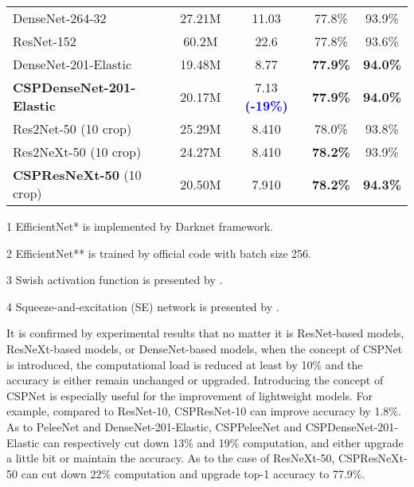 \documentclass{article}
\begin{document}
\begin{table}[h]
\begin{threeparttable}[h]
\begin{tabular}{lcccc}
			DenseNet-264-32 \cite{huang2017densely} & 27.21M & 11.03 & 77.8\% & 93.9\% \\
			ResNet-152 \cite{he2016deep} & 60.2M & 22.6 & 77.8\% & 93.6\% \\
			\midrule
			DenseNet-201-Elastic \cite{wang2019elastic} & 19.48M & 8.77 &  \textbf{77.9\%} &  \textbf{94.0\%} \\
			\textbf{CSPDenseNet-201-Elastic} & 20.17M & 7.13 \textbf{\textcolor{blue}{(-19\%)}} & \textbf{77.9\%} & \textbf{94.0\%} \\
			\midrule
			Res2Net-50 (10 crop) \cite{gao2019res2net} & 25.29M & 8.410 & 78.0\% & 93.8\% \\
			Res2NeXt-50 (10 crop) \cite{gao2019res2net} & 24.27M & 8.410 & \textbf{78.2\%} & 93.9\% \\
			\textbf{CSPResNeXt-50} (10 crop) & 20.50M & 7.910 & \textbf{78.2\%} & \textbf{94.3\%} \\
			\bottomrule
		\end{tabular}
		\begin{tablenotes}[flushleft]
			\footnotesize
			\item[1] EfficientNet* is implemented by Darknet framework.
			\item[2] EfficientNet** is trained by official code with batch size 256.
			\item[3] Swish activation function is presented by \cite{elfwing2018sigmoid, ramachandran2017searching}.
			\item[4] Squeeze-and-excitation (SE) network is presented by \cite{hu2018squeeze}.
		\end{tablenotes}
	\end{threeparttable}
\end{table}

It is confirmed by experimental results that no matter it is ResNet-based models, ResNeXt-based models, or DenseNet-based models, when the concept of CSPNet is introduced, the computational load is reduced at least by 10\% and the accuracy is either remain unchanged or upgraded.  Introducing the concept of CSPNet is especially useful for the improvement of lightweight models.  For example, compared to ResNet-10, CSPResNet-10 can improve accuracy by 1.8\%.  As to PeleeNet and DenseNet-201-Elastic, CSPPeleeNet and CSPDenseNet-201-Elastic can respectively cut down 13\% and 19\% computation, and either upgrade a little bit or maintain the accuracy.  As to the case of ResNeXt-50, CSPResNeXt-50 can cut down 22\% computation and upgrade top-1 accuracy to 77.9\%.
\end{document}
